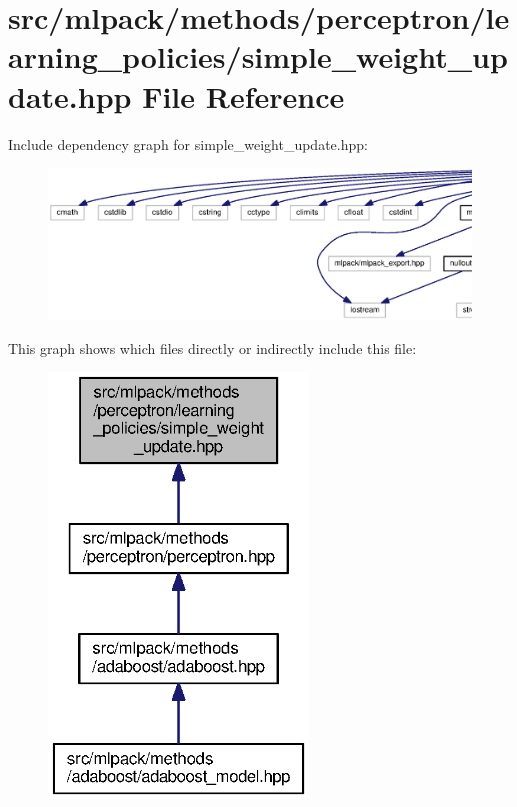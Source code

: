 \section{src/mlpack/methods/perceptron/learning\+\_\+policies/simple\+\_\+weight\+\_\+update.hpp File Reference}
\label{simple__weight__update_8hpp}
Include dependency graph for simple\+\_\+weight\+\_\+update.\+hpp\+:
\nopagebreak
\begin{figure}[H]
\begin{center}
\leavevmode
\includegraphics[width=350pt]{simple__weight__update_8hpp__incl}
\end{center}
\end{figure}
This graph shows which files directly or indirectly include this file\+:
\nopagebreak
\begin{figure}[H]
\begin{center}
\leavevmode
\includegraphics[width=196pt]{simple__weight__update_8hpp__dep__incl}
\end{center}
\end{figure}
